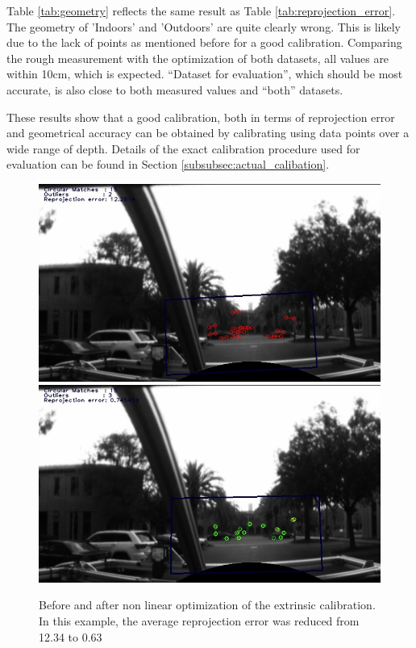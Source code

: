 Table \ref{tab:geometry} reflects the same result as Table \ref{tab:reprojection_error}.  The geometry of 'Indoors' and 'Outdoors' are quite clearly wrong.  This is likely due to the lack of points as mentioned before for a good calibration.  Comparing the rough measurement with the optimization of both datasets, all values are within 10cm, which is expected.  ``Dataset for evaluation'', which should be most accurate, is also close to both measured values and ``both'' datasets.

These results show that a good calibration, both in terms of reprojection error and geometrical accuracy can be obtained by calibrating using data points over a wide range of depth. Details of the exact calibration procedure used for evaluation can be found in Section \ref{subsubsec:actual_calibation}.

\begin{figure}[h!]
  \centering
    \includegraphics[width=1.0\textwidth]{chapters/images/verify_before_opt}
    \includegraphics[width=1.0\textwidth]{chapters/images/verify_after_opt}
  \caption{Before and after non linear optimization of the extrinsic calibration.  In this example, the average reprojection error was reduced from 12.34 to 0.63}
  \label{fig:before_after_g2o}
\end{figure}